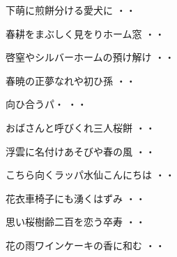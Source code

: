 \vspace{0.6cm}
\begin{shiika}下萌に煎餅分ける愛犬に
\hfill{・・}\end{shiika}
\vspace{0.6cm}
\begin{shiika}春耕をまぶしく見をりホーム窓
\hfill{・・}\end{shiika}
\vspace{0.6cm}
\begin{shiika}啓窒やシルバーホームの預け解け
\hfill{・・}\end{shiika}
\vspace{0.6cm}
\begin{shiika}春暁の正夢なれや初ひ孫
\hfill{・・}\end{shiika}
\vspace{0.6cm}
\begin{shiika}向ひ合うパ・
\hfill{・・}\end{shiika}
\vspace{0.6cm}
\begin{shiika}おばさんと呼びくれ三人桜餅
\hfill{・・}\end{shiika}
\vspace{0.6cm}
\begin{shiika}浮雲に名付けあそびや春の風
\hfill{・・}\end{shiika}
\vspace{0.6cm}
\begin{shiika}こちら向くラッパ水仙こんにちは
\hfill{・・}\end{shiika}
\vspace{0.6cm}
\begin{shiika}花衣車椅子にも湧くはずみ
\hfill{・・}\end{shiika}
\vspace{0.6cm}
\begin{shiika}思い桜樹齢二百を恋う卒寿
\hfill{・・}\end{shiika}
\vspace{0.6cm}
\begin{shiika}花の雨ワインケーキの香に和む
\hfill{・・}\end{shiika}
\vspace{0.6cm}
